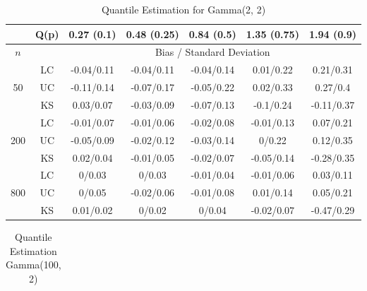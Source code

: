\documentclass[10pt]{article}
\begin{document}
\begin{center}	

\begin{table}[H]

\caption{Quantile Estimation for Gamma(2, 2)}

\begin{tabular} {| c | c | c | c | c | c | c | } 


	 \hline
		&Q(p)&	0.27 (0.1)&	0.48 (0.25)&	0.84 (0.5)&	1.35 (0.75)&	1.94 (0.9)\\ 
 \hline 
 	$n$ & & \multicolumn{5}{|c|}{Bias / Standard Deviation} 
 \\ 
 \hline 
\multirow{3}{*}{50}		&	LC	&-0.04/0.11	&-0.04/0.11	&-0.04/0.14	&0.01/0.22	&0.21/0.31\\ 
			&	UC	&-0.11/0.14	&-0.07/0.17	&-0.05/0.22	&0.02/0.33	&0.27/0.4\\ 
			&	KS	&0.03/0.07	&-0.03/0.09	&-0.07/0.13	&-0.1/0.24	&-0.11/0.37\\ 
	\hline 
\multirow{3}{*}{200}		&	LC	&-0.01/0.07	&-0.01/0.06	&-0.02/0.08	&-0.01/0.13	&0.07/0.21\\ 
			&	UC	&-0.05/0.09	&-0.02/0.12	&-0.03/0.14	&0/0.22	&0.12/0.35\\ 
			&	KS	&0.02/0.04	&-0.01/0.05	&-0.02/0.07	&-0.05/0.14	&-0.28/0.35\\ 
	\hline 
\multirow{3}{*}{800}		&	LC	&0/0.03	&0/0.03	&-0.01/0.04	&-0.01/0.06	&0.03/0.11\\ 
			&	UC	&0/0.05	&-0.02/0.06	&-0.01/0.08	&0.01/0.14	&0.05/0.21\\ 
			&	KS	&0.01/0.02	&0/0.02	&0/0.04	&-0.02/0.07	&-0.47/0.29\\ 
	\hline 

\end{tabular}

\end{table}


\begin{table}[H]

\caption{Quantile Estimation Gamma(100, 2)}

\begin{tabular} {| c | c | c | c | c | c | c | } 


\end{tabular}
\end{table}
\end{center}
\end{document}
